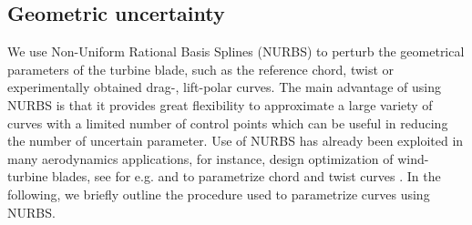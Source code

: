 \documentclass[review]{elsarticle}
\numberwithin{equation}{section}
\numberwithin{equation}{section}
\begin{document}
\subsection{Geometric uncertainty}
We use Non-Uniform Rational Basis Splines (NURBS) \cite{rogers2000} to perturb the geometrical parameters of the turbine blade, such as the reference chord, twist or experimentally obtained drag-, lift-polar curves. The main advantage of using NURBS is that it provides great flexibility to approximate a large variety of curves with a limited number of control points which can be useful in reducing the number of uncertain parameter. %
Use of NURBS has already been exploited in many aerodynamics applications, for instance, design optimization of wind-turbine blades, see for e.g. \cite{Ribeiro2012,Bottasso2014} and to parametrize chord and twist curves \cite{Echeverria2017}. In the following, we briefly outline the procedure used to parametrize curves using NURBS.
\end{document}
